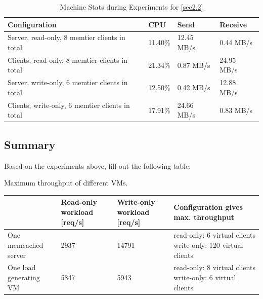 \documentclass[11pt,a4paper]{article}
\begin{document}
\begin{center}
    \begin{table}
    	\begin{tabular}{|l|p{2cm}|p{2cm}|p{2cm}|}
            \hline \textbf{Configuration} & \textbf{CPU} & \textbf{Send} & \textbf{Receive}\\
            \hline Server, read-only, 8 memtier clients in total & 11.40\%         & 12.45 MB/s    & 0.44 MB/s\\
            \hline Clients, read-only, 8 memtier clients in total & 21.34\%           & 0.87 MB/s     & 24.95 MB/s\\
            \hline Server, write-only,  6 memtier clients in total & 12.50\%        & 0.42 MB/s     & 12.88 MB/s\\
            \hline Clients, write-only, 6 memtier clients in total & 17.91\%       & 24.66 MB/s     & 0.83 MB/s\\
            \hline
    	\end{tabular}
	\caption{Machine Stats during Experiments for \autoref{sec2.2}}
    \label{dstat:2-2}
	\end{table}
\end{center}



\subsection{Summary}

Based on the experiments above, fill out the following table:

\begin{center}
	{Maximum throughput of different VMs.}
	\begin{tabular}{|l|p{2cm}|p{2cm}|p{7cm}|}
		\hline                        & Read-only workload [req/s] & Write-only workload [req/s] & Configuration gives max. throughput \\ 
		\hline One memcached server   &          2937          &      14791               &            read-only: 6 virtual clients \newline write-only: 120 virtual clients                         \\ 
		\hline One load generating VM &        5847            &          5943           &         read-only: 8 virtual clients \newline write-only: 6 virtual clients                            \\ 
		\hline 
	\end{tabular}
\end{center}
\end{document}
